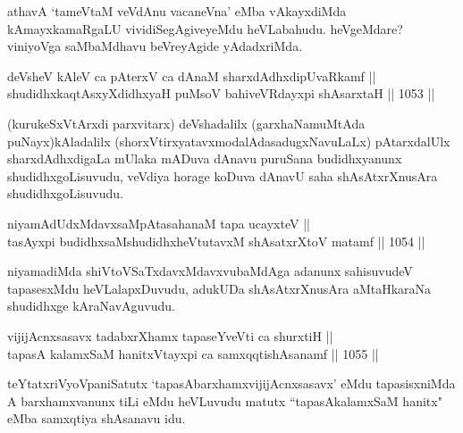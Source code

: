 \begin{artha}
athavA `tameVtaM veVdAnu vacaneVna' eMba vAkayxdiMda kAmayxkamaRgaLU vividiSegAgiveyeMdu heVLabahudu. heVgeMdare? viniyoVga saMbaMdhavu beVreyAgide yAdadxriMda.
\end{artha}


\begin{shl}
deVsheV kAleV ca pAterxV ca dAnaM sharxdAdhxdipUvaRkamf || \\
shudidhxkaqtAsxyXdidhxyaH puMsoV bahiveVRdayxpi shAsarxtaH \hfill || 1053 ||  
\end{shl}

\begin{artha}
(kurukeSxVtArxdi parxvitarx) deVshadalilx (garxhaNamuMtAda puNayx)kAladalilx (shorxVtirxyatavxmodalAdasadugxNavuLaLx) pAtarxdalUlx sharxdAdhxdigaLa mUlaka mADuva dAnavu puruSana budidhxyanunx shudidhxgoLisuvudu, veVdiya horage koDuva dAnavU saha shAsAtxrXnusAra shudidhxgoLisuvudu.
\end{artha}


\begin{shl}
niyamAdUdxMdavxsaMpAtasahanaM tapa ucayxteV || \\
tasAyxpi budidhxsaMshudidhxheVtutavxM shAsatxrXtoV matamf \hfill || 1054 ||  
\end{shl}

\begin{artha}
niyamadiMda shiVtoVSaTxdavxMdavxvubaMdAga adanunx sahisuvudeV tapasesxMdu heVLalapxDuvudu, adukUDa shAsAtxrXnusAra aMtaHkaraNa shudidhxge kAraNavAguvudu.
\end{artha}

\begin{shl}
vijijAcnxsasavx tadabxrXhamx tapaseYveVti ca shurxtiH || \\
tapasA kalamxSaM hanitxVtayxpi ca samxqqtishAsanamf \hfill || 1055 ||  
\end{shl}

\begin{artha}
teYtatxriVyoVpaniSatutx `tapasAbarxhamxvijijAcnxsasavx' eMdu tapasisxniMda A barxhamxvanunx tiLi eMdu heVLuvudu matutx ``tapasAkalamxSaM hanitx" eMba samxqtiya shAsanavu idu.
\end{artha}


